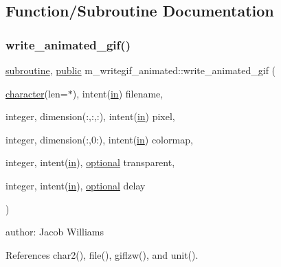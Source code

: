 \subsection{Function/\+Subroutine Documentation}
\mbox{\label{namespacem__writegif__animated_a3da6a5c71a9d9e1f49aa075adc6629bd}} 
\subsubsection{\texorpdfstring{write\+\_\+animated\+\_\+gif()}{write\_animated\_gif()}}
{\footnotesize\ttfamily \hyperlink{M__stopwatch_83_8txt_acfbcff50169d691ff02d4a123ed70482}{subroutine}, \hyperlink{M__stopwatch_83_8txt_a2f74811300c361e53b430611a7d1769f}{public} m\+\_\+writegif\+\_\+animated\+::write\+\_\+animated\+\_\+gif (\begin{DoxyParamCaption}\item[{\hyperlink{option__stopwatch_83_8txt_abd4b21fbbd175834027b5224bfe97e66}{character}(len=$\ast$), intent(\hyperlink{M__journal_83_8txt_afce72651d1eed785a2132bee863b2f38}{in})}]{filename,  }\item[{integer, dimension(\+:,\+:,\+:), intent(\hyperlink{M__journal_83_8txt_afce72651d1eed785a2132bee863b2f38}{in})}]{pixel,  }\item[{integer, dimension(\+:,0\+:), intent(\hyperlink{M__journal_83_8txt_afce72651d1eed785a2132bee863b2f38}{in})}]{colormap,  }\item[{integer, intent(\hyperlink{M__journal_83_8txt_afce72651d1eed785a2132bee863b2f38}{in}), \hyperlink{option__stopwatch_83_8txt_aa4ece75e7acf58a4843f70fe18c3ade5}{optional}}]{transparent,  }\item[{integer, intent(\hyperlink{M__journal_83_8txt_afce72651d1eed785a2132bee863b2f38}{in}), \hyperlink{option__stopwatch_83_8txt_aa4ece75e7acf58a4843f70fe18c3ade5}{optional}}]{delay }\end{DoxyParamCaption})}



author\+: Jacob Williams 



References char2(), file(), giflzw(), and unit().

